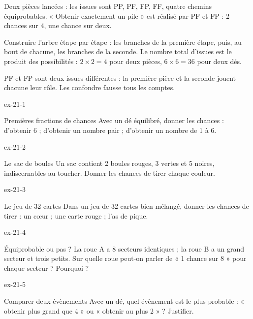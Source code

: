 \begin{exemple}Deux pièces lancées : les issues sont PP, PF, FP, FF, quatre chemins équiprobables. « Obtenir exactement un pile » est réalisé par PF et FP : 2 chances sur 4, une chance sur deux.\end{exemple}
\begin{savoirfaire}Construire l’arbre étape par étape : les branches de la première étape, puis, au bout de chacune, les branches de la seconde. Le nombre total d’issues est le produit des possibilités : $2\times2=4$ pour deux pièces, $6\times6=36$ pour deux dés.\end{savoirfaire}
\begin{attention}PF et FP sont deux issues différentes : la première pièce et la seconde jouent chacune leur rôle. Les confondre fausse tous les comptes.\end{attention}

\clearpage{}
\begin{blocLivre}{ex-21-1}\begin{exercice}[1]{Premières fractions de chances}
Avec un dé équilibré, donner les chances : d’obtenir 6 ; d’obtenir un nombre pair ; d’obtenir un nombre de 1 à 6.
\end{exercice}\end{blocLivre}
\begin{blocLivre}{ex-21-2}\begin{exercice}[1]{Le sac de boules}
Un sac contient 2 boules rouges, 3 vertes et 5 noires, indiscernables au toucher. Donner les chances de tirer chaque couleur.
\label{fig-ex-21-2}
\end{exercice}\end{blocLivre}
\begin{blocLivre}{ex-21-3}\begin{exercice}[1]{Le jeu de 32 cartes}
Dans un jeu de 32 cartes bien mélangé, donner les chances de tirer : un cœur ; une carte rouge ; l’as de pique.
\end{exercice}\end{blocLivre}
\begin{blocLivre}{ex-21-4}\begin{exercice}[1]{Équiprobable ou pas ?}
La roue A a 8 secteurs identiques ; la roue B a un grand secteur et trois petits. Sur quelle roue peut-on parler de « 1 chance sur 8 » pour chaque secteur ? Pourquoi ?
\label{fig-ex-21-4}
\end{exercice}\end{blocLivre}
\begin{blocLivre}{ex-21-5}\begin{exercice}[1]{Comparer deux évènements}
Avec un dé, quel évènement est le plus probable : « obtenir plus grand que 4 » ou « obtenir au plus 2 » ? Justifier.
\end{exercice}\end{blocLivre}

